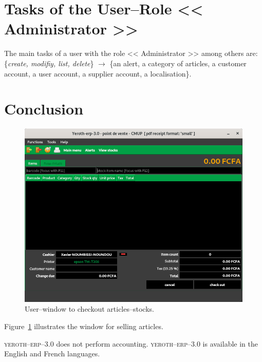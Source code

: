 \documentclass[a4paper, 10pt, twocolumn]{article}
\newcommand{\yeren}{\textsc{yeroth--erp--3.0}\xspace}
\newcommand{\administrator}{<< Administrator >>\xspace}
\begin{document}
\vspace{-1.1em}
\section{Tasks of the User--Role \administrator}\label{tachesadmin}
\vspace{-0.3em}
The main tasks of a user with the role \administrator
among others are:\\
\{\emph{create, modifiy, list, delete}\} $\longrightarrow$
\hspace{0.09cm} \{an alert, a category of articles,
a customer account, a user account, a supplier account,
a localisation\}.

\vspace{-0.5em}
\section{Conclusion}
\vspace{-0.9em}
\begin{figure}[!htbp]
\centering
\includegraphics[scale=0.33]{../../francais/images/yeren-pos-7-0-window-cashier.png}
\caption{User--window to checkout articles--stocks.}
\label{fig:fenetre-de-vente}
\end{figure}

Figure~\ref{fig:fenetre-de-vente} illustrates the window
for selling articles.

\yeren does not perform accounting. \yeren is
available in the English and French languages.
\end{document}
